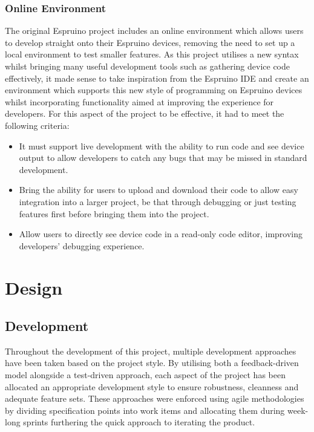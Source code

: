\documentclass{l4proj}
\begin{document}
\subsection{Online Environment}
\text The original Espruino project includes an online environment which allows users to develop straight onto their Espruino devices, removing the need to set up a local environment to test smaller features. As this project utilises a new syntax whilst bringing many useful development tools such as gathering device code effectively, it made sense to take inspiration from the Espruino IDE and create an environment which supports this new style of programming on Espruino devices whilst incorporating functionality aimed at improving the experience for developers. For this aspect of the project to be effective, it had to meet the following criteria:
\\
\begin{itemize}
    \item It must support live development with the ability to run code and see device output to allow developers to catch any bugs that may be missed in standard development.
    \item Bring the ability for users to upload and download their code to allow easy integration into a larger project, be that through debugging or just testing features first before bringing them into the project.
    \item Allow users to directly see device code in a read-only code editor, improving developers' debugging experience.
\end{itemize}

\chapter{Design}

\section{Development}

Throughout the development of this project, multiple development approaches have been taken based on the project style. By utilising both a feedback-driven model alongside a test-driven approach, each aspect of the project has been allocated an appropriate development style to ensure robustness, cleanness and adequate feature sets. These approaches were enforced using agile methodologies by dividing specification points into work items and allocating them during week-long sprints furthering the quick approach to iterating the product.
\end{document}
